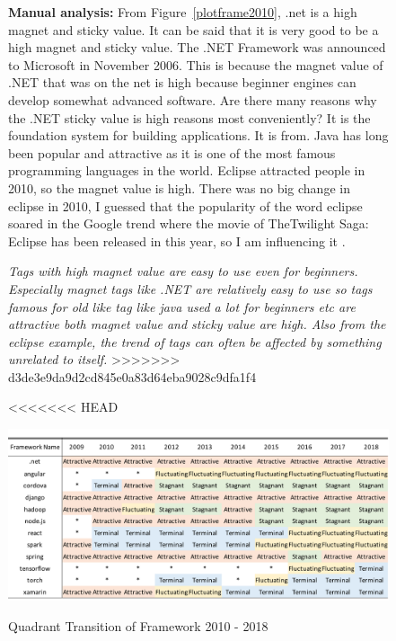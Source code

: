\documentclass[conference]{IEEEtran}
\begin{document}
\begin{figure}[t]
\begin{oframed}
\textbf{Manual analysis:}
From Figure~\ref{plotframe2010}, .net is a high magnet and sticky value. It can be said that it is very good to be a high magnet and sticky value. The .NET Framework was announced to Microsoft in November 2006. This is because the magnet value of .NET that was on the net is high because beginner engines can develop somewhat advanced software. Are there many reasons why the .NET sticky value is high reasons most conveniently? It is the foundation system for building applications. It is from. Java has long been popular and attractive as it is one of the most famous programming languages ​​in the world. Eclipse attracted people in 2010, so the magnet value is high. There was no big change in eclipse in 2010, I guessed that the popularity of the word eclipse soared in the Google trend where the movie of TheTwilight Saga: Eclipse has been released in this year, so I am influencing it .\medskip
 
\begin{oframed}
 \emph{Tags with high magnet value are easy to use even for beginners. Especially magnet tags like .NET are relatively easy to use so tags famous for old like tag like java used a lot for beginners etc are attractive both magnet value and sticky value are high. Also from the eclipse example, the trend of tags can often be affected by something unrelated to itself.}
>>>>>>> d3de3e9da9d2cd845e0a83d64eba9028c9dfa1f4
\end{oframed}
\medskip


<<<<<<< HEAD
\begin{table}[t]
 \centering
 \caption{Quadrant Transition of Framework 2010 - 2018} 
 \includegraphics[width=1.0\hsize]{img/frame2010-2018.pdf} 
 \label{table1} 
\end{table}



\end{oframed}
\end{figure}
\end{document}
